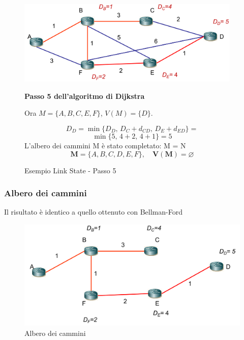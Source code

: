 \begin{figure}[h!]
    \begin{minipage}{0.5\textwidth}
        \centering
        \includegraphics[width=0.95\textwidth]{images/linkstate12.png}
        \caption{Esempio Link State - Passo 5}
        \label{fig:linkstate11}
    \end{minipage}\hfill
    \begin{minipage}{0.49\textwidth}
        \textbf{Passo 5 dell'algoritmo di Dijkstra}

        Ora $M = \{A, B, C, E, F\}$, $V(M) = \{D\}$.

        \[
        D_D = \min\{ D_D,\, D_C + d_{CD},\, D_E + d_{ED} \} = 
        \]
        \[
        \min\{5,\, 4 + 2,\, 4 + 1\} = 5
        \]
        L'albero dei cammini M è stato completato: M = N
        \[
        \mathbf{M} = \{A, B, C, D, E, F\}, \quad \mathbf{V(M)} = \varnothing
        \]\end{minipage}
\end{figure}

\subsubsection{Albero dei cammini}
Il risultato è identico a quello ottenuto con Bellman-Ford

\begin{figure}[h!]
    \centering
    \includegraphics[width=1\textwidth]{images/linkstate134.png}
    \caption{Albero dei cammini}
    \label{fig:alberocammini}
\end{figure}


